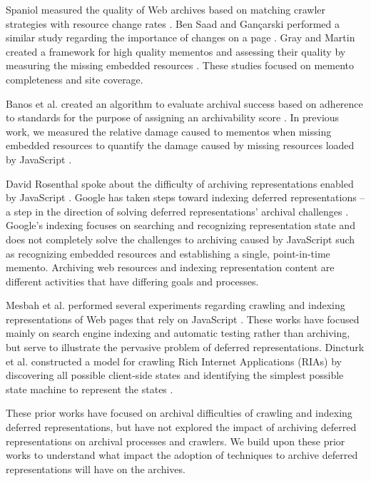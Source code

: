 \documentclass{ipres_proc_article-sp}
\begin{document}
Spaniol measured the quality of Web archives based on matching crawler strategies with resource change rates \cite{spaniol9catch, spaniol2009data, Denev:2009:SFQ:1687627.1687694}. Ben Saad and Gan\c{c}arski performed a similar study regarding the importance of changes on a page \cite{saad2011}. Gray and Martin created a framework for high quality mementos and assessing their quality by measuring the missing embedded resources \cite{mementoQuality}. These studies focused on memento completeness and site coverage.

Banos et al. created an algorithm to evaluate archival success based on adherence to standards for the purpose of assigning an archivability score \cite{ipresArchivability}. In previous work, we measured the relative damage caused to mementos when missing embedded resources to quantify the damage caused by missing resources loaded by JavaScript \cite{brunelleDamage}.

David Rosenthal \cite{iipc2013} spoke about the difficulty of archiving representations enabled by JavaScript \cite{futureWeb}. Google has taken steps toward indexing deferred representations -- a step in the direction of solving deferred representations' archival challenges \cite{googleJS}. Google's indexing focuses on searching and recognizing representation state and does not completely solve the challenges to archiving caused by JavaScript such as recognizing embedded resources and establishing a single, point-in-time memento. Archiving web resources and indexing representation content are different activities that have differing goals and processes.

Mesbah et al. performed several experiments regarding crawling and indexing representations of Web pages that rely on JavaScript \cite{mesbahCrawling, mesbahInferState}. These works have focused mainly on search engine indexing and automatic testing \cite{mesbahTesting, mesbah2} rather than archiving, but serve to illustrate the pervasive problem of deferred representations. Dincturk et al. constructed a model for crawling Rich Internet Applications (RIAs) by discovering all possible client-side states and identifying the simplest possible state machine to represent the states \cite{dincturkAjax}. 

These prior works have focused on archival difficulties of crawling and indexing deferred representations, but have not explored the impact of archiving deferred representations on archival processes and crawlers. We build upon these prior works to understand what impact the adoption of techniques to archive deferred representations will have on the archives.
\end{document}
